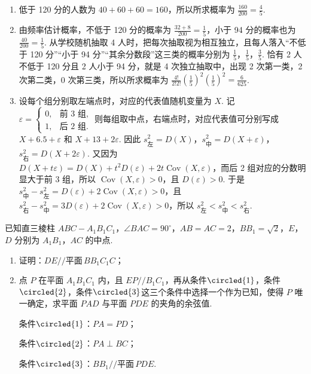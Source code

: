 \begin{solution}
\begin{enumerate}
\item 低于 120 分的人数为 \( 40+60+60=160 \)，所以所求概率为 \( \frac{160}{200}=\frac{4}{5} \).

\item 由频率估计概率，不低于 120 分的概率为 \( \frac{32+8}{200}=\frac{1}{5} \)，小于 94 分的概率也为 \( \frac{40}{200}=\frac{1}{5} \).
从学校随机抽取 4 人时，把每次抽取视为相互独立，且每人落入“不低于 120 分”“小于 94 分”“其余分数段”这三类的概率分别为 \( \frac{1}{5} \)，\( \frac{1}{5} \)，\( \frac{3}{5} \).
恰有 2 人不低于 120 分且 2 人小于 94 分，就是 4 次独立抽取中，出现 2 次第一类，2 次第二类，0 次第三类，所以所求概率为 \( \frac{4!}{2!2!}\left( \frac{1}{5} \right)^2\left( \frac{1}{5} \right)^2=\frac{6}{625} \).

\item 设每个组分别取左端点时，对应的代表值随机变量为 \(X\). 记
\(
\varepsilon=
\begin{cases}
0, & \text{前 3 组},\\
1, & \text{后 2 组}.
\end{cases}
\)
则每组取中点，右端点时，对应代表值可分别写成 \( X+6.5+\varepsilon \) 和 \( X+13+2\varepsilon \).
因此 \( s_{\text{左}}^2=D\left( X \right) \)，\( s_{\text{中}}^2=D\left( X+\varepsilon \right) \)，\( s_{\text{右}}^2=D\left( X+2\varepsilon \right) \).
又因为 \( D\left( X+t\varepsilon \right)=D\left( X \right)+t^2D\left( \varepsilon \right)+2t\operatorname{Cov}\left( X,\varepsilon \right) \)，而后 2 组对应的分数明显大于前 3 组，所以 \( \operatorname{Cov}\left( X,\varepsilon \right)>0 \)，且 \( D\left( \varepsilon \right)>0 \). 于是 \( s_{\text{中}}^2-s_{\text{左}}^2=D\left( \varepsilon \right)+2\operatorname{Cov}\left( X,\varepsilon \right)>0 \)，且 \( s_{\text{右}}^2-s_{\text{中}}^2=3D\left( \varepsilon \right)+2\operatorname{Cov}\left( X,\varepsilon \right)>0 \)，所以 \( s_{\text{左}}^2<s_{\text{中}}^2<s_{\text{右}}^2 \).
\end{enumerate}
\end{solution}

\begin{problem}
已知直三棱柱 \( ABC-A_1B_1C_1 \)，\( \angle BAC=90^\circ \)，\( AB=AC=2 \)，\( BB_1=\sqrt{2} \)，\(E\)，\(D\) 分别为 \(A_1B_1\)，\(AC\) 的中点.

\begin{enumerate}
\item 证明：\( DE // \text{平面}\, BB_1C_1C \)；
\item 点 \(P\) 在平面 \(A_1B_1C_1\) 内，且 \( EP//B_1C_1 \)，再从条件\(\circled{1}\)，条件\(\circled{2}\)，条件\(\circled{3}\)这三个条件中选择一个作为已知，使得 \(P\) 唯一确定，求平面 \(PAD\) 与平面 \(PDE\) 的夹角的余弦值.

条件\(\circled{1}\)：\( PA=PD \)；

条件\(\circled{2}\)：\( PA\perp BC \)；

条件\(\circled{3}\)：\( BB_1 // \text{平面}\, PDE \).

\end{enumerate}

\end{problem}

